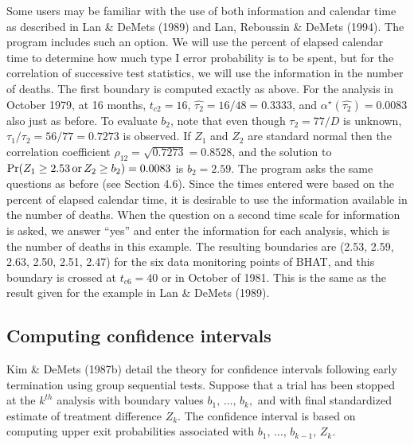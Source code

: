Some users may be familiar with the use of both information and calendar
time as described in Lan \& DeMets (1989) and Lan, Reboussin \& DeMets
(1994).  The program includes such an option.  We will use the percent of
elapsed calendar time to determine how much type I error probability is to
be spent, but for the correlation of successive test statistics, we will
use the information in the number of deaths.  The first boundary is computed
exactly as above.  For the analysis in October 1979, at 16 months, $t_{c2}
= 16$, $\hat{\tau_2} = 16/48 = 0.3333$, and $\alpha^{\star}(\hat{\tau_2}) =
0.0083$ also just as before.  To evaluate $b_2$, note that even though
$\tau_2 = 77/D$ is unknown, $\tau_1/\tau_2 = 56/77 = 0.7273$ is observed.
If $Z_1$ and $Z_2$ are standard normal then the correlation coefficient
$\rho_{12} = \sqrt{0.7273} = 0.8528$, and the solution to \begin{math}
\Pr(Z_1 \geq 2.53 \, {\rm or} \, Z_2 \geq b_2) = 0.0083 \end{math} is $b_2 =
2.59$.  The program asks the same questions as before (see Section 4.6).
Since the times entered were based on the percent of elapsed calendar time,
it is desirable to use the information available in the number of deaths.
When the question on a second time scale for information is asked, we
answer ``yes'' and enter the information for each analysis, which is the
number of deaths in this example.  The resulting boundaries are (2.53, 2.59,
2.63, 2.50, 2.51, 2.47) for the six data monitoring points of BHAT, and
this boundary is crossed at $t_{c6} = 40$ or in October of 1981.  This is
the same as the result given for the example in Lan \& DeMets (1989).



\subsection{Computing confidence intervals}

Kim \& DeMets (1987b) detail the theory for confidence intervals
following early termination using group sequential tests.  Suppose that
a trial has been stopped at the $k^{th}$ analysis with boundary values
\begin{math}
  b_1,\,\ldots,\,b_k,
\end{math}
and with final standardized estimate of treatment difference $Z_k$.  The
confidence interval is based on computing upper exit probabilities
associated with
\begin{math}
  b_1,\,\ldots,\,b_{k-1},\,Z_k.
\end{math}


